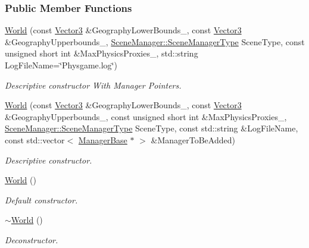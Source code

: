 \subsubsection*{Public Member Functions}
\begin{DoxyCompactItemize}
\item 
\hyperlink{classphys_1_1World_a87775405d6e7c8f2926fe6e4cd12de10}{World} (const \hyperlink{classphys_1_1Vector3}{Vector3} \&GeographyLowerBounds\_\-, const \hyperlink{classphys_1_1Vector3}{Vector3} \&GeographyUpperbounds\_\-, \hyperlink{classphys_1_1SceneManager_a14fe15dcf41564fdf12f3e11c1a4b774}{SceneManager::SceneManagerType} SceneType, const unsigned short int \&MaxPhysicsProxies\_, std::string LogFileName=\char`\"{}Physgame.log\char`\"{})
\begin{DoxyCompactList}\small\item\em Descriptive constructor With Manager Pointers. \item\end{DoxyCompactList}\item 
\hyperlink{classphys_1_1World_a8518c8d24854852fb04704d808e06581}{World} (const \hyperlink{classphys_1_1Vector3}{Vector3} \&GeographyLowerBounds\_\-, const \hyperlink{classphys_1_1Vector3}{Vector3} \&GeographyUpperbounds\_\-, const unsigned short int \&MaxPhysicsProxies\_\-, \hyperlink{classphys_1_1SceneManager_a14fe15dcf41564fdf12f3e11c1a4b774}{SceneManager::SceneManagerType} SceneType, const std::string \&LogFileName, const std::vector$<$ \hyperlink{classphys_1_1ManagerBase}{ManagerBase} $\ast$ $>$ \&ManagerToBeAdded)
\begin{DoxyCompactList}\small\item\em Descriptive constructor. \item\end{DoxyCompactList}\item 
\hyperlink{classphys_1_1World_a7f762724406c874250c3dc8910a1e695}{World} ()
\begin{DoxyCompactList}\small\item\em Default constructor. \item\end{DoxyCompactList}\item 
\hyperlink{classphys_1_1World_a8b2c74c7e5d5ce3c46a814e183a7aff1}{$\sim$World} ()
\begin{DoxyCompactList}\small\item\em Deconstructor. \item\end{DoxyCompactList}\item 

\end{DoxyCompactItemize}
